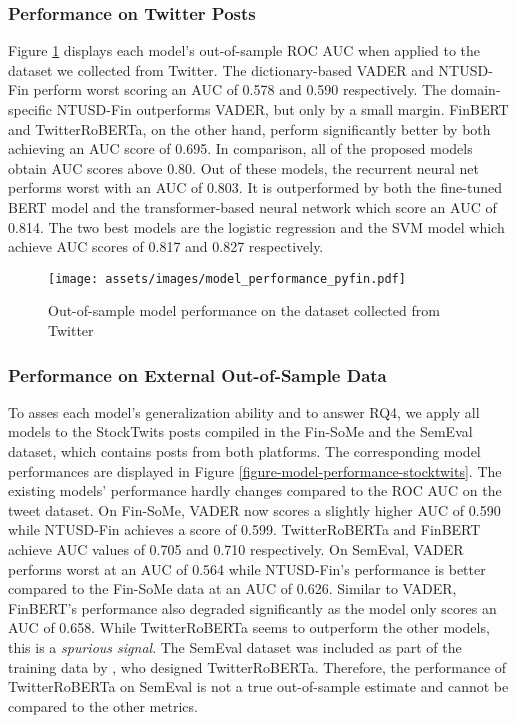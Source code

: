 \subsubsection{Performance on Twitter Posts}
Figure \ref{figure-model-performance-twitter} displays each model's out-of-sample ROC AUC when applied to the dataset we collected from Twitter. The dictionary-based VADER and NTUSD-Fin perform worst scoring an AUC of 0.578 and 0.590 respectively. The domain-specific NTUSD-Fin outperforms VADER, but only by a small margin. FinBERT and TwitterRoBERTa, on the other hand, perform significantly better by both achieving an AUC score of 0.695.\newline
In comparison, all of the proposed models obtain AUC scores above 0.80. Out of these models, the recurrent neural net performs worst with an AUC of 0.803. It is outperformed by both the fine-tuned BERT model and the transformer-based neural network which score an AUC of 0.814. The two best models are the logistic regression and the SVM model which achieve AUC scores of 0.817 and 0.827 respectively.


\begin{figure}[!ht]
	\texttt{[image: assets/images/model\_performance\_pyfin.pdf]}	
	\caption{Out-of-sample model performance on the dataset collected from Twitter}
	\label{figure-model-performance-twitter}
\end{figure}



\subsubsection{Performance on External Out-of-Sample Data}
\label{section-modelperf-on-finsome}
To asses each model's generalization ability and to answer RQ4, we apply all models to the StockTwits posts compiled in the Fin-SoMe and the SemEval dataset, which contains posts from both platforms. The corresponding model performances are displayed in Figure \ref{figure-model-performance-stocktwits}. The existing models' performance hardly changes compared to the ROC AUC on the tweet dataset.\newline
On Fin-SoMe, VADER now scores a slightly higher AUC of 0.590 while NTUSD-Fin achieves a score of 0.599. TwitterRoBERTa and FinBERT achieve AUC values of 0.705 and 0.710 respectively.\newline
On SemEval, VADER performs worst at an AUC of 0.564 while NTUSD-Fin's performance is better compared to the Fin-SoMe data at an AUC of 0.626. Similar to VADER, FinBERT's performance also degraded significantly as the model only scores an AUC of 0.658. While TwitterRoBERTa seems to outperform the other models, this is a \emph{spurious signal}. The SemEval dataset was included as part of the training data by , who designed TwitterRoBERTa. Therefore, the performance of TwitterRoBERTa on SemEval is not a true out-of-sample estimate and cannot be compared to the other metrics.

